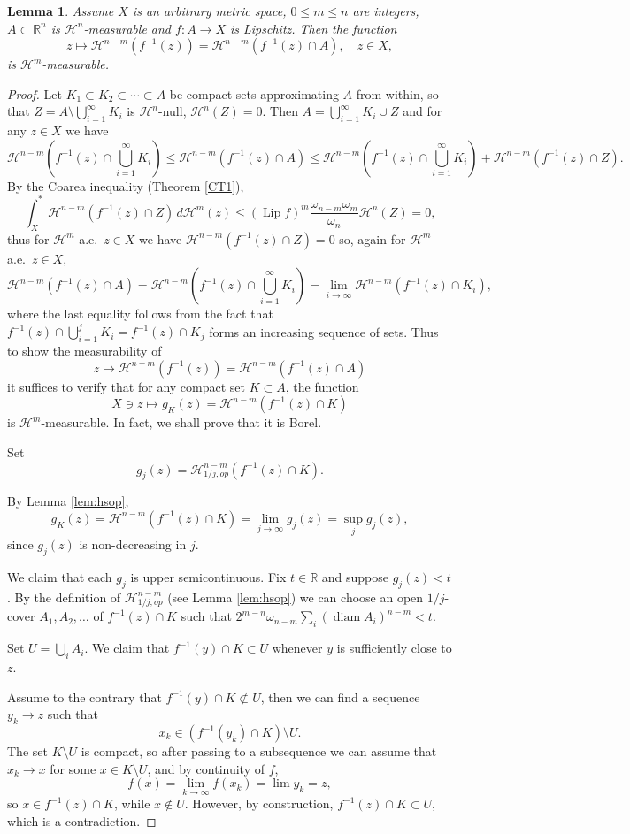 \documentclass[12pt,leqno]{amsart}
\newtheorem{lemma}[theorem]{Lemma}
\theoremstyle{definition}
\newcommand{\bbbr}{\mathbb R}
\def\diam{\operatorname{diam}}
\def\H{{\mathcal H}}
\numberwithin{theorem}{section} \numberwithin{equation}{section}
\begin{document}
\begin{lemma}
\label{lem:measfib}
Assume $X$ is an arbitrary metric space, $0\leq m\leq n$ are integers, $A\subset \bbbr^n$ is $\H^n$-measurable and $f:A\to X$ is Lipschitz. Then the function
$$
z\longmapsto \H^{n-m}(f^{-1}(z))=\H^{n-m}(f^{-1}(z)\cap A),\quad z\in X,
$$
is $\H^m$-measurable.
\end{lemma}
\begin{proof}
Let $K_1\subset K_2\subset\cdots\subset A$ be compact sets approximating $A$ from within, so that $Z=A\setminus \bigcup_{i=1}^\infty K_i$ is $\H^n$-null, $\H^n(Z)=0$. Then $A=\bigcup_{i=1}^\infty K_i \cup Z$ and for  any $z\in X$ we have
$$
\H^{n-m}(f^{-1}(z)\cap \bigcup_{i=1}^\infty K_i)\leq \H^{n-m}(f^{-1}(z)\cap A)\leq \H^{n-m}(f^{-1}(z)\cap\bigcup_{i=1}^\infty K_i)+\H^{n-m}(f^{-1}(z)\cap Z).$$
By the Coarea inequality (Theorem \ref{CT1}),
$$
\int_X^{*}
    \H^{n-m}\left(f^{-1}(z)\cap Z\right)\,d\H^m(z)
\leq
(\operatorname{Lip} f)^m\frac{\omega_{n-m}\omega_m}{\omega_n}\H^n(Z)=0,
$$
thus for $\H^m$-a.e.\ $z\in X$ we have $\H^{n-m}\left(f^{-1}(z)\cap Z\right)=0$
so, again for $\H^m$-a.e.\ $z\in X$,
$$
\H^{n-m}(f^{-1}(z)\cap A)=\H^{n-m}(f^{-1}(z)\cap \bigcup_{i=1}^\infty K_i)=\lim_{i\to\infty}  \H^{n-m}(f^{-1}(z)\cap K_i),
$$
where the last equality follows from the fact that $f^{-1}(z)\cap \bigcup_{i=1}^j K_i=f^{-1}(z)\cap K_j$ forms an increasing sequence of sets. Thus to show the measurability of
$$
z\longmapsto \H^{n-m}(f^{-1}(z))=\H^{n-m}(f^{-1}(z)\cap A)
$$
it suffices to verify that for any compact set $K\subset A$, the function
$$
X\ni z\longmapsto g_K(z)=\H^{n-m}(f^{-1}(z)\cap K)
$$ is $\H^m$-measurable. In fact, we shall prove that it is Borel.

Set
$$
g_j(z)=\H^{n-m}_{1/j,op}(f^{-1}(z)\cap K).
$$

By Lemma \ref{lem:hsop},
$$
g_K(z)=\H^{n-m}(f^{-1}(z)\cap K)=\lim_{j\to\infty} g_j(z)=\sup_j g_j(z),
$$
since $g_j(z)$ is non-decreasing in $j$.

We claim that each $g_j$ is upper semicontinuous. Fix $t\in \bbbr$ and suppose $g_j(z)<t$. By the definition of $\H^{n-m}_{1/j,op}$ (see Lemma \ref{lem:hsop}) we can choose an open $1/j$-cover $A_1,A_2,\ldots$ of $f^{-1}(z)\cap K$ such that $2^{m-n}\omega_{n-m}\sum_i(\diam A_i)^{n-m}<t.$

Set $U=\bigcup_i A_i$. We claim that $f^{-1}(y)\cap K\subset U$ whenever $y$ is sufficiently close to $z$.

Assume to the contrary that $f^{-1}(y)\cap K\not \subset U$, then we can find a sequence $y_k\to z$ such that
$$
x_k\in (f^{-1}(y_k)\cap K)\setminus U.
$$
The set $K\setminus U$ is compact, so after passing to a subsequence we can assume that $x_k\to x$ for some $x\in K\setminus U$, and by continuity of $f$,
$$
f(x)=\lim_{k\to\infty}f(x_k)=\lim y_k=z,
$$
so $x\in f^{-1}(z)\cap K$, while $x\not \in U$. However, by construction, $f^{-1}(z)\cap K\subset U$, which is a contradiction.


\end{proof}
\end{document}
